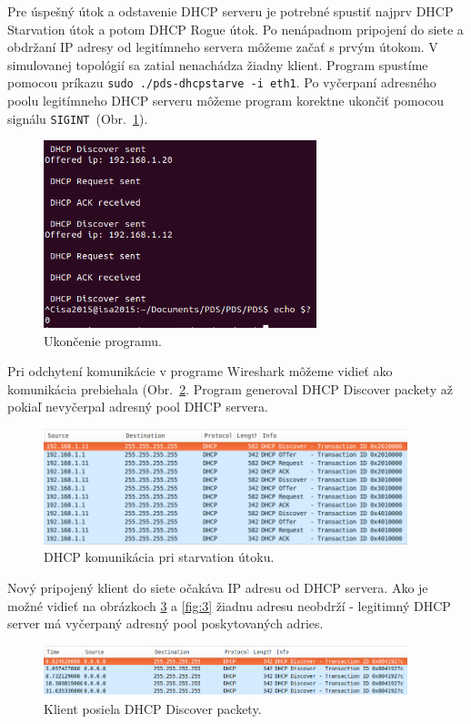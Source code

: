 \documentclass{article}
\begin{document}
Pre úspešný útok a odstavenie DHCP serveru je potrebné spustiť najprv DHCP Starvation útok a potom DHCP Rogue útok. Po nenápadnom pripojení do siete a obdržaní IP adresy od legitímneho servera môžeme začať s prvým útokom. V simulovanej topológií sa zatial nenachádza žiadny klient. Program spustíme pomocou príkazu \texttt{sudo ./pds-dhcpstarve -i eth1}. Po vyčerpaní adresného poolu legitímneho DHCP serveru môžeme program korektne ukončiť pomocou signálu \texttt{SIGINT}~(Obr.~\ref{fig:0}).

\newpage
\begin{figure}[h]
    \centering
    \includegraphics[width=300px]{pic/0.png}
    \caption{Ukončenie programu.}
    \label{fig:0}
\end{figure}

Pri odchytení komunikácie v programe Wireshark môžeme vidieť ako komunikácia prebiehala (Obr.~\ref{fig:1}. Program generoval DHCP Discover packety až pokiaľ nevyčerpal adresný pool DHCP servera.

\begin{figure}[h]
    \centering
    \includegraphics[width=400px]{pic/1.png}
    \caption{DHCP komunikácia pri starvation útoku.}
    \label{fig:1}
\end{figure}

\newpage

Nový pripojený klient do siete očakáva IP adresu od DHCP servera. Ako je možné vidieť na obrázkoch \ref{fig:2} a \ref{fig:3} žiadnu adresu neobdrží - legitimný DHCP server má vyčerpaný adresný pool poskytovaných adries.

\begin{figure}[h]
    \centering
    \includegraphics[width=400px]{pic/2.png}
    \caption{Klient posiela DHCP Discover packety.}
    \label{fig:2}
\end{figure}
\end{document}
